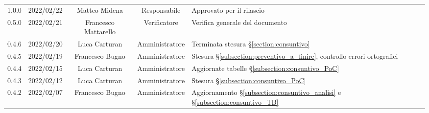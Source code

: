 \begin{center}
\begin{longtable}[c]{c | c | c | c | p{5cm}}
		1.0.0                                                      & 2022/02/22 & Matteo Midena                          & Responsabile   & Approvato per il rilascio                                                                                                                 \\
		0.5.0                                                      & 2022/02/21 & Francesco Mattarello                   & Verificatore   & Verifica generale del documento                                                                                                           \\
		0.4.6                                                      & 2022/02/20 & Luca Carturan                          & Amministratore & Terminata stesura §\ref{section:consuntivo}                                                                                               \\
		0.4.5                                                      & 2022/02/19 & Francesco Bugno                        & Amministratore & Stesura §\ref{subsection:preventivo_a_finire}, controllo errori ortografici                                                               \\
		0.4.4                                                      & 2022/02/15 & Luca Carturan                          & Amministratore & Aggiornate tabelle §\ref{subsection:consuntivo_PoC}                                                                                       \\
		0.4.3                                                      & 2022/02/12 & Luca Carturan                          & Amministratore & Stesura §\ref{subsection:consuntivo_PoC}                                                                                                  \\
		0.4.2                                                      & 2022/02/07 & Francesco Bugno                        & Amministratore & Aggiornamento §\ref{subsection:consuntivo_analisi} e §\ref{subsection:consuntivo_TB}                                                      \\


\end{longtable}
\end{center}
